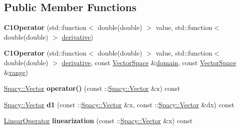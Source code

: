 \subsection*{Public Member Functions}
\begin{DoxyCompactItemize}
\item 
\hypertarget{classSpacy_1_1Scalar_1_1C1Operator_a88127af1231ebe28124f2af4bf92238a}{{\bfseries C1\-Operator} (std\-::function$<$ double(double) $>$ value, std\-::function$<$ double(double) $>$ \hyperlink{namespaceSpacy_a002fe344fa6d04a6ac59a74ea25fddb6}{derivative})}\label{classSpacy_1_1Scalar_1_1C1Operator_a88127af1231ebe28124f2af4bf92238a}

\item 
\hypertarget{classSpacy_1_1Scalar_1_1C1Operator_ab43acacd1497620e38041baa9ed8d872}{{\bfseries C1\-Operator} (std\-::function$<$ double(double) $>$ value, std\-::function$<$ double(double) $>$ \hyperlink{namespaceSpacy_a002fe344fa6d04a6ac59a74ea25fddb6}{derivative}, const \hyperlink{classSpacy_1_1VectorSpace}{Vector\-Space} \&\hyperlink{classSpacy_1_1OperatorBase_a2588f9b3e0188820c4c494e63293dc6f}{domain}, const \hyperlink{classSpacy_1_1VectorSpace}{Vector\-Space} \&\hyperlink{classSpacy_1_1OperatorBase_ab19d3b7a6f290b1079248f1e567e53d6}{range})}\label{classSpacy_1_1Scalar_1_1C1Operator_ab43acacd1497620e38041baa9ed8d872}

\item 
\hypertarget{classSpacy_1_1Scalar_1_1C1Operator_a9ab2d8a905a70dd848c984e532b50fed}{\hyperlink{classSpacy_1_1Vector}{Spacy\-::\-Vector} {\bfseries operator()} (const \-::\hyperlink{classSpacy_1_1Vector}{Spacy\-::\-Vector} \&x) const }\label{classSpacy_1_1Scalar_1_1C1Operator_a9ab2d8a905a70dd848c984e532b50fed}

\item 
\hypertarget{classSpacy_1_1Scalar_1_1C1Operator_a56908ac8a9cd1e959f15e3f71a00a01b}{\hyperlink{classSpacy_1_1Vector}{Spacy\-::\-Vector} {\bfseries d1} (const \-::\hyperlink{classSpacy_1_1Vector}{Spacy\-::\-Vector} \&x, const \-::\hyperlink{classSpacy_1_1Vector}{Spacy\-::\-Vector} \&dx) const }\label{classSpacy_1_1Scalar_1_1C1Operator_a56908ac8a9cd1e959f15e3f71a00a01b}

\item 
\hypertarget{classSpacy_1_1Scalar_1_1C1Operator_acefccd4cac61750dad6053a963b10944}{\hyperlink{structSpacy_1_1Scalar_1_1LinearOperator}{Linear\-Operator} {\bfseries linearization} (const \-::\hyperlink{classSpacy_1_1Vector}{Spacy\-::\-Vector} \&x) const }\label{classSpacy_1_1Scalar_1_1C1Operator_acefccd4cac61750dad6053a963b10944}


\end{DoxyCompactItemize}
